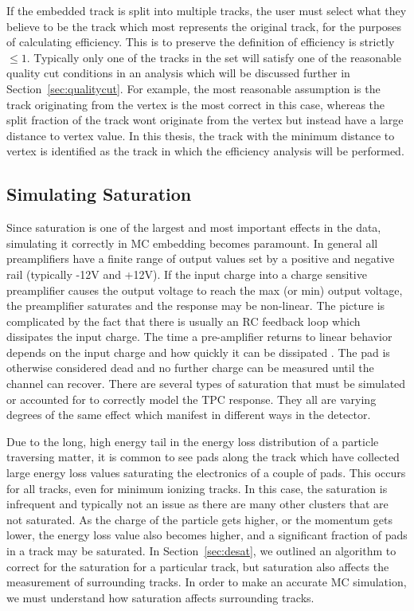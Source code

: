 If the embedded track is split into multiple tracks, the user must select what they believe to be the track which most represents the original track, for the purposes of calculating efficiency. This is to preserve the definition of efficiency is strictly $\leq 1$. Typically only one of the tracks in the set will satisfy one of the reasonable quality cut conditions in an analysis which will be discussed further in Section~\ref{sec:qualitycut}. For example, the most reasonable assumption is the track originating from the vertex is the most correct in this case, whereas the split fraction of the track wont originate from the vertex but instead have a large distance to vertex value. In this thesis, the track with the minimum distance to vertex is identified as the track in which the efficiency analysis will be performed.



\subsection{Simulating Saturation}
\label{sec:simSat}

Since saturation is one of the largest and most important effects in the data, simulating it correctly in MC embedding becomes paramount. In general all preamplifiers have a finite range of output values set by a positive and negative rail (typically -12V and +12V). If the input charge into a charge sensitive preamplifier causes the output voltage to reach the max (or min) output voltage, the preamplifier saturates and the response may be non-linear. The picture is complicated by the fact that there is usually an RC feedback loop which dissipates the input charge. The time a pre-amplifier returns to linear behavior depends on the input charge and how quickly it can be dissipated \cite{akiGET}. The pad is otherwise considered dead and no further charge can be measured until the channel can recover. There are several types of saturation that must be simulated or accounted for to correctly model the TPC response. They all are varying degrees of the same effect which manifest in different ways in the detector. 
 
Due to the long, high energy tail in  the energy loss distribution of a particle traversing matter, it is common to see pads along the track which have collected large energy loss values saturating the electronics of a couple of pads. This occurs for all tracks, even for minimum ionizing tracks. In this case, the saturation is infrequent and typically not an issue as there are many other clusters that are not saturated. As the charge of the particle gets higher, or the momentum gets lower, the  energy loss value also becomes higher, and a significant fraction of pads in a track may be saturated. In Section~\ref{sec:desat}, we outlined an algorithm to correct for the saturation for a  particular track, but saturation also affects the measurement of surrounding tracks. In order to make an accurate MC simulation, we must understand how saturation affects surrounding tracks. 

